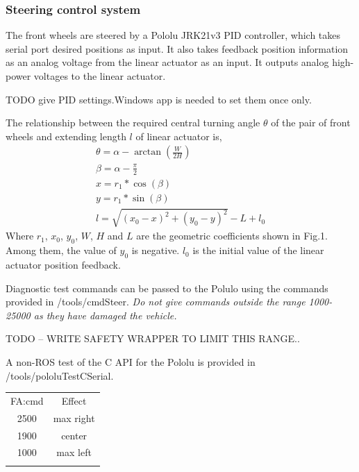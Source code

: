 \documentclass[a4paper]{article}
\begin{document}
\subsubsection{Steering control system}

The front wheels are steered by a Pololu JRK21v3 PID controller, which takes serial port desired positions as input. It also takes feedback position information as an analog voltage from the linear actuator as an input. It outputs analog high-power voltages to the linear actuator.

TODO give PID settings.Windows app is needed to set them once only. 



The relationship between the required central turning angle $\theta$ of the pair of front wheels and extending length $l$ of linear actuator is,    
\begin{gather}
\theta = \alpha - \arctan(\frac{W}{2H}) \\
\beta = \alpha -\frac{\pi}{2}\\
x = r_1 * \cos(\beta) \\
y = r_1 * \sin(\beta) \\
l = \sqrt{(x_0-x)^2 + (y_0-y)^2} - L + l_0    
\end{gather}    
Where $r_1$, $x_0$, $y_0$, $W$, $H$ and $L$ are the geometric coefficients shown in Fig.1. Among them, the value of $y_0$ is negative. $l_0$ is the initial value of the linear actuator position feedback.


Diagnostic test commands can be passed to the Polulo using the commands provided in /tools/cmdSteer.   {\em Do not give commands outside the range 1000-25000 as they have damaged the vehicle.}  

TODO -- WRITE SAFETY WRAPPER TO LIMIT THIS RANGE..

A non-ROS test of the C API for the Pololu is provided in /tools/pololuTestCSerial.    

\begin{center}
	\begin{tabular}{ c c }
		\hline
		FA:cmd     &  Effect \\
		2500    &    max right  \\
		1900    &    center  \\ 
		1000    &    max left  \\
		\hline\\
	\end{tabular}
\end{center}    
\end{document}
